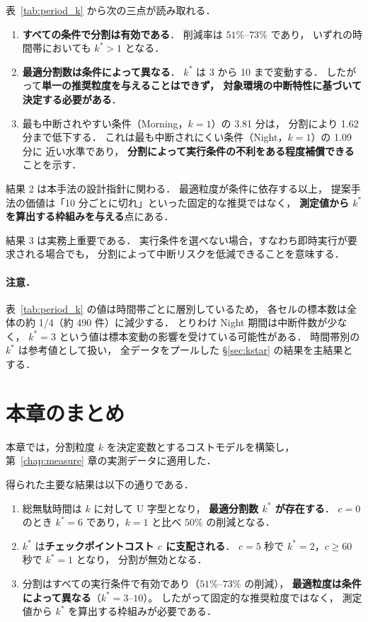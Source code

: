 \documentclass[11pt,a4paper]{ltjsreport}
\begin{document}
表~\ref{tab:period_k} から次の三点が読み取れる．

\begin{enumerate}
  \item \textbf{すべての条件で分割は有効である}．
        削減率は $51\%$--$73\%$ であり，
        いずれの時間帯においても $k^{*} > 1$ となる．
  \item \textbf{最適分割数は条件によって異なる}．
        $k^{*}$ は 3 から 10 まで変動する．
        したがって\textbf{単一の推奨粒度を与えることはできず，
        対象環境の中断特性に基づいて決定する必要がある}．
  \item 最も中断されやすい条件（Morning，$k{=}1$）の 3.81 分は，
        分割により 1.62 分まで低下する．
        これは最も中断されにくい条件（Night，$k{=}1$）の 1.09 分に
        近い水準であり，
        \textbf{分割によって実行条件の不利をある程度補償できる}
        ことを示す．
\end{enumerate}

結果 2 は本手法の設計指針に関わる．
最適粒度が条件に依存する以上，
提案手法の価値は「10 分ごとに切れ」といった固定的な推奨ではなく，
\textbf{測定値から $k^{*}$ を算出する枠組みを与える}点にある．

結果 3 は実務上重要である．
実行条件を選べない場合，すなわち即時実行が要求される場合でも，
分割によって中断リスクを低減できることを意味する．

\paragraph{注意．}
表~\ref{tab:period_k} の値は時間帯ごとに層別しているため，
各セルの標本数は全体の約 1/4（約 490 件）に減少する．
とりわけ Night 期間は中断件数が少なく，
$k^{*}=3$ という値は標本変動の影響を受けている可能性がある．
時間帯別の $k^{*}$ は参考値として扱い，
全データをプールした \S\ref{sec:kstar} の結果を主結果とする．

\section{本章のまとめ}

本章では，分割粒度 $k$ を決定変数とするコストモデルを構築し，
第~\ref{chap:measure} 章の実測データに適用した．

得られた主要な結果は以下の通りである．

\begin{enumerate}
  \item 総無駄時間は $k$ に対して U 字型となり，
        \textbf{最適分割数 $k^{*}$ が存在する}．
        $c=0$ のとき $k^{*}=6$ であり，$k=1$ と比べ $50\%$ の削減となる．
  \item $k^{*}$ は\textbf{チェックポイントコスト $c$ に支配される}．
        $c=5$ 秒で $k^{*}=2$，$c \geq 60$ 秒で $k^{*}=1$ となり，
        分割が無効となる．
  \item 分割はすべての実行条件で有効であり（$51\%$--$73\%$ の削減），
        \textbf{最適粒度は条件によって異なる}（$k^{*}=3$--$10$）。
        したがって固定的な推奨粒度ではなく，
        測定値から $k^{*}$ を算出する枠組みが必要である．
\end{enumerate}
\end{document}
